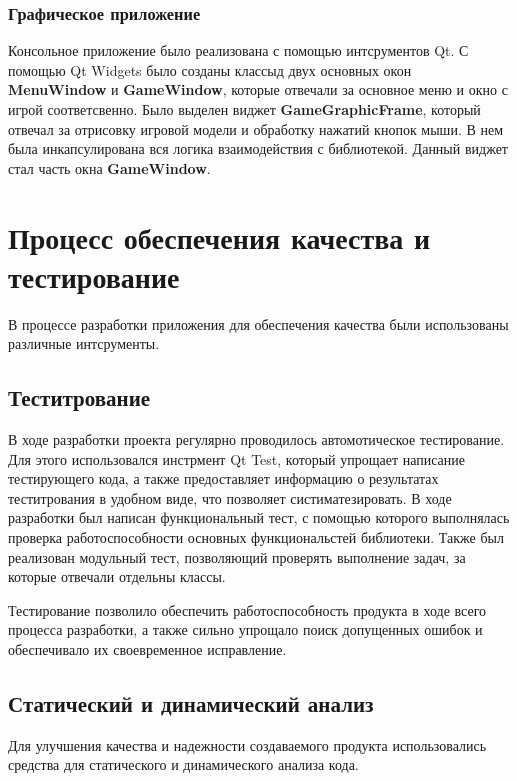 \subsubsection{Графическое приложение}

Консольное приложение было реализована с помощью интсрументов Qt. С помощью Qt Widgets было созданы классыд двух основных окон \textbf{MenuWindow} и \textbf{GameWindow}, которые отвечали за основное меню и окно с игрой соответсвенно. Было выделен виджет \textbf{GameGraphicFrame}, который отвечал за отрисовку игровой модели и обработку нажатий кнопок мыши. В нем была инкапсулирована вся логика взаимодействия с библиотекой. Данный виджет стал часть окна \textbf{GameWindow}.
   
\section{Процесс обеспечения качества и тестирование}

В процессе разработки приложения для обеспечения качества были использованы различные интсрументы.

\subsection{Теститрование}

В ходе разработки проекта регулярно проводилось автомотическое тестирование. Для этого использовался инстрмент Qt Test, который упрощает написание тестирующего кода, а также предоставляет информацию о результатах теститрования в удобном виде, что позволяет систиматезировать. В ходе разработки был написан функциональный тест, с помощью которого выполнялась проверка работоспособности основных функциональстей библиотеки. Также был реализован модульный тест, позволяющий проверять выполнение задач, за которые отвечали отдельны классы.

Тестирование позволило обеспечить работоспособность продукта в ходе всего процесса разработки, а также сильно упрощало поиск допущенных ошибок и обеспечивало их своевременное исправление.   

\subsection{Статический и динамический анализ}

Для улучшения качества и надежности создаваемого продукта использовались средства для статического и динамического анализа кода.

